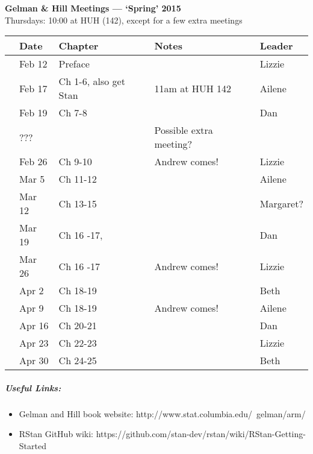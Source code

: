 \documentclass[11pt]{article}
\newenvironment{smitemize}{
\begin{itemize}
  \setlength{\itemsep}{0pt}
  \setlength{\parskip}{0.8pt}
  \setlength{\parsep}{0pt}}
{\end{itemize}
}
\begin{document}
 
\raggedright
{}

\begin{center} 
{\large \textbf{Gelman \& Hill Meetings --- `Spring' 2015}} \\ [2pt]
Thursdays: 10:00 at HUH (142), except for a few extra meetings\\
\end{center} 

\begin{center}
\begin{tabular}{ p{0.7 cm}  p{1.5 cm}  p{5 cm}  p{5 cm}  p{1.5 cm} }  \hline \hline
 & \textbf{Date}
   & \textbf{Chapter}
      & \textbf{Notes} 
         & \textbf{Leader} \\ 
\hline \hline
 & Feb 12  &  Preface&        & Lizzie \\\hline
 & Feb 17  & Ch 1-6, also get Stan   &  11am at HUH 142 & Ailene  \\\hline
 & Feb 19  & Ch 7-8 &      & Dan \\\hline
 & ???  &  &  Possible extra meeting?     &  \\\hline
 & Feb 26 & Ch 9-10 &  Andrew comes! & Lizzie  \\\hline
 & Mar 5 & Ch 11-12 &        & Ailene   \\\hline
 & Mar 12 & Ch 13-15 &  & Margaret? \\\hline
 & Mar 19 & Ch 16 -17, &        & Dan \\\hline
 & Mar 26 & Ch 16 -17 &  Andrew comes! & Lizzie  \\\hline
 & Apr 2& Ch 18-19   &  & Beth  \\\hline
 & Apr 9 & Ch 18-19   &  Andrew comes!& Ailene  \\\hline
 & Apr 16 &Ch 20-21 &  & Dan  \\\hline
 & Apr 23 & Ch 22-23       & & Lizzie \\\hline
 & Apr 30& Ch 24-25  & & Beth\\\hline
\hline
\end{tabular}
\end{center}
\subparagraph{Useful Links:} 
\begin{smitemize}
\item Gelman and Hill book website: http://www.stat.columbia.edu/~gelman/arm/
\item RStan GitHub wiki: https://github.com/stan-dev/rstan/wiki/RStan-Getting-Started
\end{smitemize}
\end{document}
